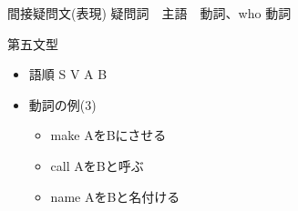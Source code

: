 \documentclass[10pt]{jsarticle}
\newcommand{\answer}[2]{{\color{orange}#2}}
\newcommand{\answer}[2]{\vspace{#1mm}}
\begin{document}
\begin{itembox}[l]{間接疑問文(表現)}
	\answer{10}{疑問詞　主語　動詞、who 動詞}
\end{itembox}

\begin{itembox}[l]{第五文型}
	\begin{itemize}
		\item 語順 \answer{10}{S V A B}
		\item 動詞の例(3)\answer{20}{
			      \begin{multicols}{3}
				      \begin{itemize}
					      \item make \answer{5}{AをBにさせる}
					      \item call \answer{5}{AをBと呼ぶ}
					      \item name \answer{5}{AをBと名付ける}
				      \end{itemize}
			      \end{multicols}
		      }
	\end{itemize}
\end{itembox}
\end{document}
